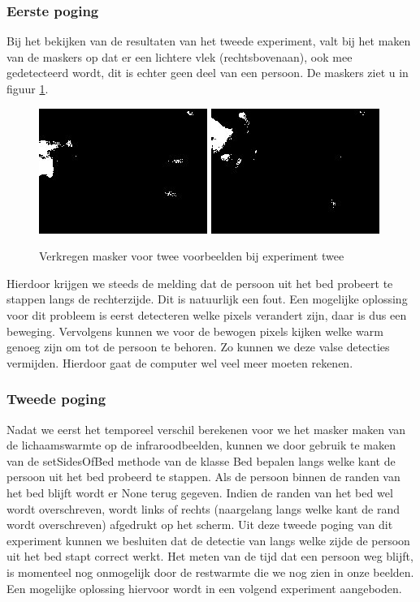 \subsubsection{Eerste poging }
Bij het bekijken van de resultaten van het tweede experiment, valt bij het maken van de maskers op dat er een lichtere vlek (rechtsbovenaan), ook mee gedetecteerd wordt, dit is echter geen deel van een persoon. De maskers ziet u in figuur \ref{imgCDUB}.
\begin{figure}[hbp]
	\includegraphics[scale = 0.75]{MaskTweedeExperiment_img0}
	\includegraphics[scale = 0.75]{MaskTweedeExperiment_img4}
	\caption{Verkregen masker voor twee voorbeelden bij experiment twee}
	\label{imgCDUB}
\end{figure}
Hierdoor krijgen we steeds de melding dat de persoon uit het bed probeert te stappen langs de rechterzijde. Dit is natuurlijk een fout. Een mogelijke oplossing voor dit probleem is eerst detecteren welke pixels verandert zijn, daar is dus een beweging. Vervolgens kunnen we voor de bewogen pixels kijken welke warm genoeg zijn om tot de persoon te behoren. Zo kunnen we deze valse detecties vermijden. Hierdoor gaat de computer wel veel meer moeten rekenen.

\subsubsection{Tweede poging}
Nadat we eerst het temporeel verschil berekenen voor we het masker maken van de lichaamswarmte op de infraroodbeelden, kunnen we door gebruik te maken van de setSidesOfBed methode van de klasse Bed bepalen langs welke kant de persoon uit het bed probeerd te stappen. Als de persoon binnen de randen van het bed blijft wordt er None terug gegeven. Indien de randen van het bed wel wordt overschreven, wordt links of rechts (naargelang langs welke kant de rand wordt overschreven) afgedrukt op het scherm. Uit deze tweede poging van dit experiment kunnen we besluiten dat de detectie van langs welke zijde de persoon uit het bed stapt correct werkt. Het meten van de tijd dat een persoon weg blijft, is momenteel nog onmogelijk door de restwarmte die we nog zien in onze beelden. Een mogelijke oplossing hiervoor wordt in een volgend experiment aangeboden. 

